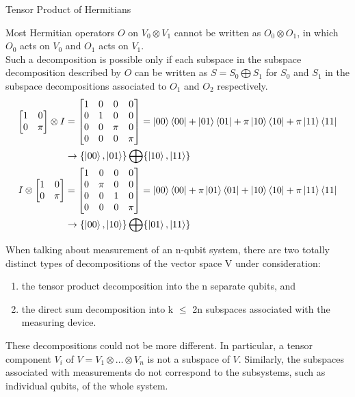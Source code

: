 \documentclass{beamer}
\begin{document}
\begin{frame}{Tensor Product of Hermitians}
  {\tiny
    Most Hermitian operators $O$ on $V_0 \otimes V_1$ cannot be written as $O_0 \otimes O_1$,
    in which $O_0$ acts on $V_0$ and $O_1$ acts on $V_1$. \\
    Such a decomposition is possible only if each subspace in the subspace decomposition described by $O$
    can be written as $S = S_0 \bigoplus S_1$
    for $S_0$ and $S_1$ in the subspace decompositions associated to $O_1$ and $O_2$ respectively. \\
    \begin{align*}
      \begin{bmatrix} 
        1 & 0 \\
        0 & \pi
      \end{bmatrix} \otimes I
      &=
      \begin{bmatrix}
        1 & 0 & 0 & 0 \\
        0 & 1 & 0 & 0 \\
        0 & 0 & \pi & 0 \\
        0 & 0 & 0 & \pi 
      \end{bmatrix}
      = \ket{00} \bra{00} + \ket{01} \bra{01} + \pi \ket{10} \bra{10} + \pi \ket{11} \bra{11} \\
      & \rightarrow \{\ket{00}, \ket{01}\} \bigoplus \{\ket{10}, \ket{11}\} \\
      I \otimes
      \begin{bmatrix} 
        1 & 0 \\
        0 & \pi
      \end{bmatrix}
      &=
      \begin{bmatrix}
        1 & 0 & 0 & 0 \\
        0 & \pi & 0 & 0 \\
        0 & 0 & 1 & 0 \\
        0 & 0 & 0 & \pi 
      \end{bmatrix}
      = \ket{00} \bra{00} + \pi \ket{01} \bra{01} + \ket{10} \bra{10} + \pi \ket{11} \bra{11} \\
      & \rightarrow \{\ket{00}, \ket{10}\} \bigoplus \{\ket{01}, \ket{11}\}
    \end{align*}

    \vspace{0.2cm}
    When talking about measurement of an n-qubit system, there are two totally distinct types of
    decompositions of the vector space V under consideration:\\
    \begin{enumerate}[I]
      \item the tensor product decomposition into the n separate qubits, and
      \item the direct sum decomposition into k $\leq$ 2n subspaces associated with the measuring device. 
    \end{enumerate}
    These decompositions could not be more different.
    In particular, a tensor component $V_i$ of $V = V_1 \otimes \dots \otimes V_n$ is not a subspace of $V$.
    Similarly, the subspaces associated with measurements do not correspond to the subsystems,
    such as individual qubits, of the whole system.
  }%
\end{frame}
\end{document}
